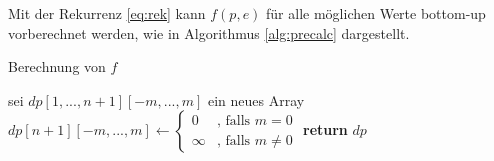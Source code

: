 \documentclass[a4paper,10pt,ngerman]{scrartcl}
\begin{document}
Mit der Rekurrenz \ref{eq:rek} kann $f(p, e)$ für alle möglichen Werte bottom-up vorberechnet werden, wie in Algorithmus \ref{alg:precalc} dargestellt.
\begin{algorithm}
\caption{Berechnung von $f$}
\label{alg:precalc}
\begin{algorithmic}[1]
    \State sei $dp[1, ..., n+1][-m, ..., m]$ ein neues Array
    \State $dp[n+1][-m, ..., m] \gets \begin{cases}
        0 & \text{, falls } m = 0\\
        \infty &\text{, falls } m \neq 0
    \end{cases}$ 
        \EndFor 
    \EndFor
    \State \textbf{return} $dp$
\EndProcedure
\end{algorithmic}
\end{algorithm} 
\end{document}
